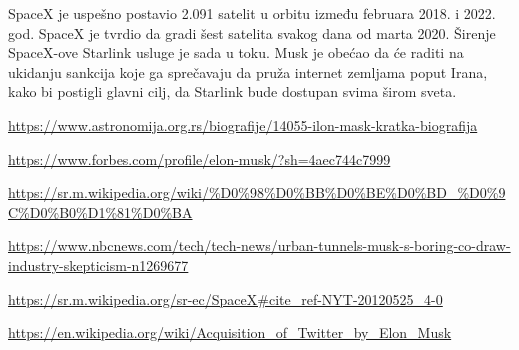 \documentclass[a4paper,11pt]{article}
\begin{document}
SpaceX je uspešno postavio 2.091 satelit u orbitu između februara 2018. i 2022. god. SpaceX je tvrdio da gradi šest satelita svakog dana od marta 2020. Širenje SpaceX-ove Starlink usluge je sada u toku. Musk je obećao da će raditi na ukidanju sankcija koje ga sprečavaju da pruža internet zemljama poput Irana, kako bi postigli glavni cilj, da Starlink bude dostupan svima širom sveta.




\appendix

\iffalse








\fi


\begin{thebibliography}{9}

 \url{https://www.astronomija.org.rs/biografije/14055-ilon-mask-kratka-biografija}


 \url{https://www.forbes.com/profile/elon-musk/?sh=4aec744c7999}



 \url{https://sr.m.wikipedia.org/wiki/%D0%98%D0%BB%D0%BE%D0%BD_%D0%9C%D0%B0%D1%81%D0%BA}

 \url{https://www.nbcnews.com/tech/tech-news/urban-tunnels-musk-s-boring-co-draw-industry-skepticism-n1269677}

 \url{https://sr.m.wikipedia.org/sr-ec/SpaceX#cite_ref-NYT-20120525_4-0}

 \url{https://en.wikipedia.org/wiki/Acquisition_of_Twitter_by_Elon_Musk}


\end{thebibliography}
\end{document}
